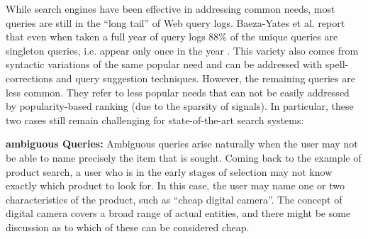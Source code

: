 While search engines have been effective in addressing common needs, most queries are still in the ``long tail'' of Web query logs. Baeza-Yates et al. report that even when taken a full year of query logs 88\% of the unique queries are singleton queries, i.e. appear only once in the year \cite{baeza07sigir}. This variety also comes from syntactic variations of the same popular need and can be addressed with spell-corrections and query suggestion techniques. However, the remaining queries are less common. They refer to less popular needs that can not be easily addressed by popularity-based ranking (due to the sparsity of signals). In particular,
these two cases still remain challenging for state-of-the-art
search systems:

\textbf{ambiguous Queries:} Ambiguous queries arise naturally when the user may not be able to name precisely the item that is sought. Coming back to the example of product search, a user who is in the early stages of selection may not know exactly which product to look for. In this case, the user may name one or two characteristics of the product, such as ``cheap digital camera''. The concept of digital camera covers a broad range of actual entities, and there might be some discussion as to which of these can be considered cheap. 
			
